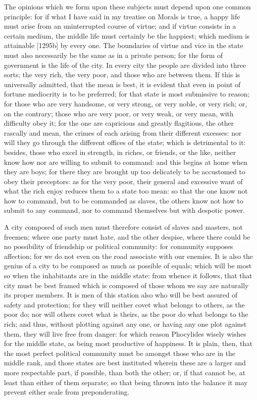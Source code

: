 The opinions which we form upon these subjects must depend upon one common
principle: for if what I have said in my treatise on Morals is true, a
happy life must arise from an uninterrupted course of virtue; and if
virtue consists in a certain medium, the middle life must certainly be the
happiest; which medium is attainable [1295b] by every one. The boundaries
of virtue and vice in the state must also necessarily be the same as in a
private person; for the form of government is the life of the city. In
every city the people are divided into three sorts; the very rich, the
very poor, and those who are between them. If this is universally
admitted, that the mean is best, it is evident that even in point of
fortune mediocrity is to be preferred; for that state is most submissive
to reason; for those who are very handsome, or very strong, or very noble,
or very rich; or, on the contrary; those who are very poor, or very weak,
or very mean, with difficulty obey it; for the one are capricious and
greatly flagitious, the other rascally and mean, the crimes of each
arising from their different excesses: nor will they go through the
different offices of the state; which is detrimental to it: besides, those
who excel in strength, in riches, or friends, or the like, neither know
how nor are willing to submit to command: and this begins at home when
they are boys; for there they are brought up too delicately to be
accustomed to obey their preceptors: as for the very poor, their general
and excessive want of what the rich enjoy reduces them to a state too
mean: so that the one know not how to command, but to be commanded as
slaves, the others know not how to submit to any command, nor to command
themselves but with despotic power.

A city composed of such men must therefore consist of slaves and masters,
not freemen; where one party must hate, and the other despise, where there
could be no possibility of friendship or political community: for
community supposes affection; for we do not even on the road associate
with our enemies. It is also the genius of a city to be composed as much
as possible of equals; which will be most so when the inhabitants are in
the middle state: from whence it follows, that that city must be best
framed which is composed of those whom we say are naturally its proper
members. It is men of this station also who will be best assured of safety
and protection; for they will neither covet what belongs to others, as the
poor do; nor will others covet what is theirs, as the poor do what belongs
to the rich; and thus, without plotting against any one, or having any one
plot against them, they will live free from danger: for which reason
Phocylides wisely wishes for the middle state, as being most productive of
happiness. It is plain, then, that the most perfect political community
must be amongst those who are in the middle rank, and those states are
best instituted wherein these are a larger and more respectable part, if
possible, than both the other; or, if that cannot be, at least than either
of them separate; so that being thrown into the balance it may prevent
either scale from preponderating.

